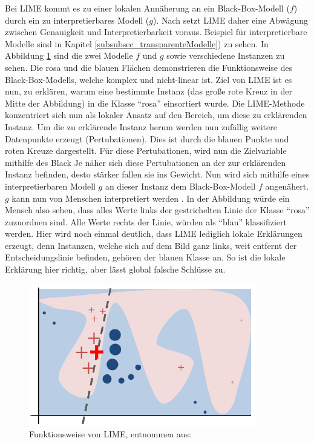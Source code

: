 Bei LIME kommt es zu einer lokalen Annäherung an ein Black-Box-Modell ($f$) durch ein zu interpretierbares Modell ($g$). Nach \textcite{ribeiro2016should} setzt LIME daher eine Abwägung zwischen Genauigkeit und Interpretierbarkeit voraus. Beispiel für interpretierbare Modelle sind in Kapitel \ref{subsubsec_transparenteModelle}) zu sehen.
In Abbildung \ref{Fig:Lime-Funktionsweise} sind die zwei Modelle $f$ und $g$ sowie verschiedene Instanzen zu sehen. Die rosa und die blauen Flächen demonstrieren die Funktionsweise des Black-Box-Modells, welche komplex und nicht-linear ist. Ziel von LIME ist es nun, zu erklären, warum eine bestimmte Instanz (das große rote Kreuz in der Mitte der Abbildung) in die Klasse \enquote{rosa} einsortiert wurde. Die LIME-Methode konzentriert sich nun als lokaler Ansatz auf den Bereich, um diese zu erklärenden Instanz. Um die zu erklärende Instanz herum werden nun zufällig weitere Datenpunkte erzeugt (Pertubationen). Dies ist durch die blauen Punkte und roten Kreuze dargestellt. Für diese Pertubationen, wird nun die Zielvariable mithilfe des Black Je näher sich diese Pertubationen an der zur erklärenden Instanz befinden, desto stärker fallen sie ins Gewicht. Nun wird sich mithilfe eines interpretierbaren Modell $g$ an dieser Instanz dem Black-Box-Modell $f$ angenähert. $g$ kann nun von Menschen interpretiert werden \cite{ribeiro2016should}. In der Abbildung würde ein Mensch also sehen, dass alles Werte links der gestrichelten Linie der Klasse \enquote{rosa} zuzuordnen sind. Alle Werte rechts der Linie, würden als \enquote{blau} klassifiziert werden. Hier wird noch einmal deutlich, dass LIME lediglich lokale Erklärungen erzeugt, denn Instanzen, welche sich auf dem Bild ganz links, weit entfernt der Entscheidungslinie befinden, gehören der blauen Klasse an. So ist die lokale Erklärung hier richtig, aber lässt global falsche Schlüsse zu.
\begin{figure}
    \centering
    \includegraphics[scale=0.45]{pic/MA-Bilder/Literaturrecherche/LIME.PNG}
    \caption{Funktionsweise von LIME, entnommen aus: \cite{ribeiro2016should}}
    \label{Fig:Lime-Funktionsweise}
\end{figure}

